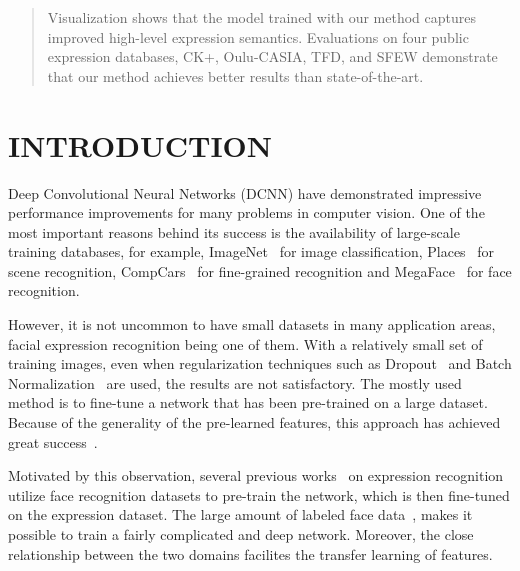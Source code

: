 \documentclass[a4paper, 10pt, conference]{ieeeconf}      %
\begin{document}
\begin{abstract}
Visualization shows that the model trained with our method captures improved high-level expression semantics.
Evaluations on four public expression databases, CK+, Oulu-CASIA, TFD, and SFEW demonstrate that our method achieves better results than state-of-the-art. 
\end{abstract}


\section{INTRODUCTION}
Deep Convolutional Neural Networks (DCNN) have demonstrated impressive performance improvements for many problems in computer vision. One of the most important reasons behind its success is the availability of large-scale training databases, for example, ImageNet~\cite{imagenet_cvpr09} for image classification, Places~\cite{zhou2014learning} for scene recognition, CompCars~\cite{yang2015large} for fine-grained recognition and MegaFace~\cite{kemelmacher2015megaface} for face recognition. 

However, it is not uncommon to have small datasets in many application areas, facial expression recognition being one of them. With a relatively small set of training images, even when regularization techniques such as Dropout~\cite{srivastava2014dropout} and Batch Normalization~\cite{ioffe2015batch} are used, the results are not satisfactory. The mostly used method is to fine-tune a network that has been pre-trained on a large dataset. Because of the generality of the pre-learned features, this approach has achieved great success~\cite{girshick2014rich}. 

Motivated by this observation, several previous works~\cite{levi2015emotion, zhao2016peak} on expression recognition utilize face recognition datasets to pre-train the network, which is then fine-tuned on the expression dataset.  
The large amount of labeled face data~\cite{kemelmacher2015megaface, yi2014learning}, makes it possible to train a fairly complicated and deep network. Moreover, the close relationship between the two domains facilites the transfer learning of features.
\end{document}
